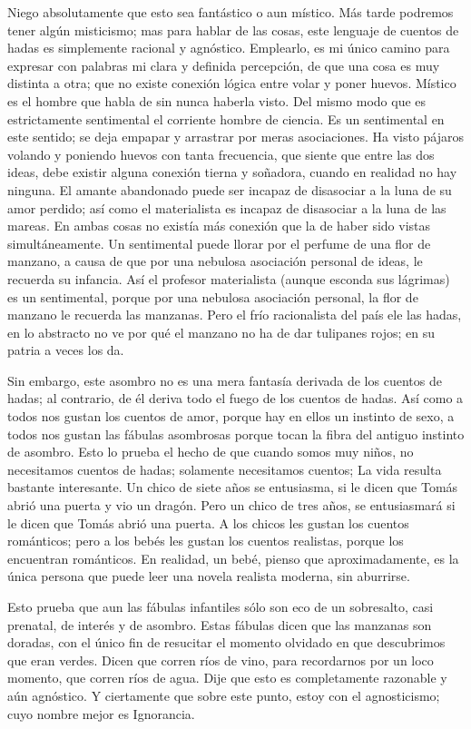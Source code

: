 Niego absolutamente que esto sea fantástico o aun místico. Más tarde podremos tener algún
misticismo; mas para hablar de las cosas, este lenguaje de cuentos de hadas es simplemente racional y
agnóstico. Emplearlo, es mi único camino para expresar con palabras mi clara y definida percepción, de
que una cosa es muy distinta a otra; que no existe conexión lógica entre volar y poner huevos. Místico es
el hombre que habla de  sin nunca haberla visto. Del mismo modo que es estrictamente
sentimental el corriente hombre de ciencia. Es un sentimental en este sentido; se deja empapar y arrastrar
por meras asociaciones. Ha visto pájaros volando y poniendo huevos con tanta frecuencia, que siente que
entre las dos ideas, debe existir alguna conexión tierna y soñadora, cuando en realidad no hay ninguna. El
amante abandonado puede ser incapaz de disasociar a la luna de su amor perdido; así como el materialista
es incapaz de disasociar a la luna de las mareas. En ambas cosas no existía más conexión que la de haber
sido vistas simultáneamente. Un sentimental puede llorar por el perfume de una flor de manzano, a causa
de que por una nebulosa asociación personal de ideas, le recuerda su infancia. Así el profesor materialista
(aunque esconda sus lágrimas) es un sentimental, porque por una nebulosa asociación personal, la flor de
manzano le recuerda las manzanas. Pero el frío racionalista del país ele las hadas, en lo abstracto no ve
por qué el manzano no ha de dar tulipanes rojos; en su patria a veces los da.

Sin embargo, este asombro no es una mera fantasía derivada de los cuentos de hadas; al contrario,
de él deriva todo el fuego de los cuentos de hadas. Así como a todos nos gustan los cuentos de amor,
porque hay en ellos un instinto de sexo, a todos nos gustan las fábulas asombrosas porque tocan la fibra
del antiguo instinto de asombro. Esto lo prueba el hecho de que cuando somos muy niños, no necesitamos
cuentos de hadas; solamente necesitamos cuentos; La vida resulta bastante interesante. Un chico de siete
años se entusiasma, si le dicen que Tomás abrió una puerta y vio un dragón. Pero un chico de tres años, se
entusiasmará si le dicen que Tomás abrió una puerta. A los chicos les gustan los cuentos románticos; pero
a los bebés les gustan los cuentos realistas, porque los encuentran románticos. En realidad, un bebé,
pienso que aproximadamente, es la única persona que puede leer una novela realista moderna, sin
aburrirse.

Esto prueba que aun las fábulas infantiles sólo son eco de un sobresalto, casi prenatal, de interés y
de asombro. Estas fábulas dicen que las manzanas son doradas, con el único fin de resucitar el momento
olvidado en que descubrimos que eran verdes. Dicen que corren ríos de vino, para recordarnos por un
loco momento, que corren ríos de agua. Dije que esto es completamente razonable y aún agnóstico. Y
ciertamente que sobre este punto, estoy con el agnosticismo; cuyo nombre mejor es Ignorancia.

